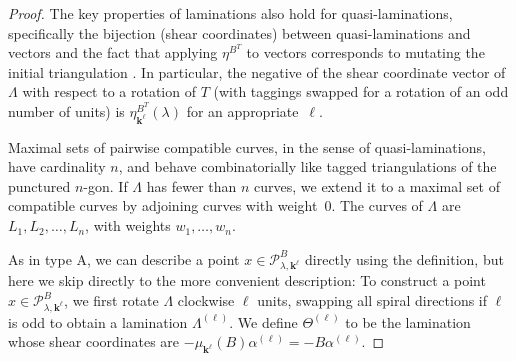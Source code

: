 \documentclass{amsart}
\theoremstyle{definition}
\theoremstyle{remark}
\numberwithin{equation}{section}
\newcommand{\0}{{\mathbf{0}}}
\newcommand{\kk}{{\boldsymbol{k}}}
\renewcommand{\P}{\mathcal{P}}
\begin{document}
\begin{proof}
The key properties of laminations also hold for quasi-laminations, specifically the bijection (shear coordinates) between quasi-laminations and vectors \cite[Theorem~4.4]{unisurface} and the fact that applying $\eta^{B^T}$ to vectors corresponds to mutating the initial triangulation \cite[Theorem~4.3]{unisurface}.
In particular, the negative of the shear coordinate vector of $\Lambda$ with respect to a rotation of $T$ (with taggings swapped for a rotation of an odd number of units) is $\eta^{B^T}_{\kk^\ell}(\lambda)$ for an appropriate~$\ell$.

Maximal sets of pairwise compatible curves, in the sense of quasi-laminations, have cardinality $n$, and behave combinatorially like tagged triangulations of the punctured $n$-gon.
If $\Lambda$ has fewer than $n$ curves, we extend it to a maximal set of compatible curves by adjoining curves with weight~$0$.
The curves of $\Lambda$ are $L_1,L_2,\ldots,L_n$, with weights $w_1,\ldots,w_n$.

As in type A, we can describe a point $x\in\P^B_{\lambda,\kk^\ell}$ directly using the definition,  %
but here we skip directly to the more convenient description:
To construct a point $x\in\P^B_{\lambda,\kk^\ell}$, we first rotate $\Lambda$ clockwise $\ell$ units, swapping all spiral directions if $\ell$ is odd to obtain a lamination $\Lambda^{(\ell)}$.
We define $\Theta^{(\ell)}$ to be the lamination whose shear coordinates are $-\mu_{\kk^\ell}(B)\alpha^{(\ell)}=-B\alpha^{(\ell)}$.


\end{proof}
\end{document}
